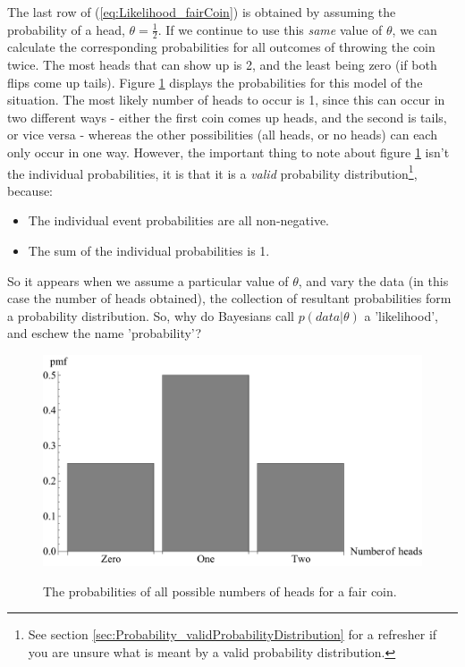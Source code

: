 \documentclass[11pt,fullpage]{book}
\begin{document}
The last row of (\ref{eq:Likelihood_fairCoin}) is obtained by assuming the probability of a head, $\theta=\frac{1}{2}$. If we continue to use this \textit{same} value of $\theta$, we can calculate the corresponding probabilities for all outcomes of throwing the coin twice. The most heads that can show up is 2, and the least being zero (if both flips come up tails). Figure \ref{fig:Likelihood_fairCoin} displays the probabilities for this model of the situation. The most likely number of heads to occur is 1, since this can occur in two different ways - either the first coin comes up heads, and the second is tails, or vice versa - whereas the other possibilities (all heads, or no heads) can each only occur in one way. However, the important thing to note about figure \ref{fig:Likelihood_fairCoin} isn't the individual probabilities, it is that it is a \textit{valid} probability distribution\footnote{See section \ref{sec:Probability_validProbabilityDistribution} for a refresher if you are unsure what is meant by a valid probability distribution.}, because:

\begin{itemize}
\item The individual event probabilities are all non-negative.
\item The sum of the individual probabilities is 1.
\end{itemize}

So it appears when we assume a particular value of $\theta$, and vary the data (in this case the number of heads obtained), the collection of resultant probabilities form a probability distribution. So, why do Bayesians call $p(data|\theta)$ a 'likelihood', and eschew the name 'probability'?

\begin{figure}
\centering
\scalebox{0.5} 
{\includegraphics{Likelihood_fairCoin.pdf}}
\caption{The probabilities of all possible numbers of heads for a fair coin.}\label{fig:Likelihood_fairCoin}
\end{figure}
\end{document}
